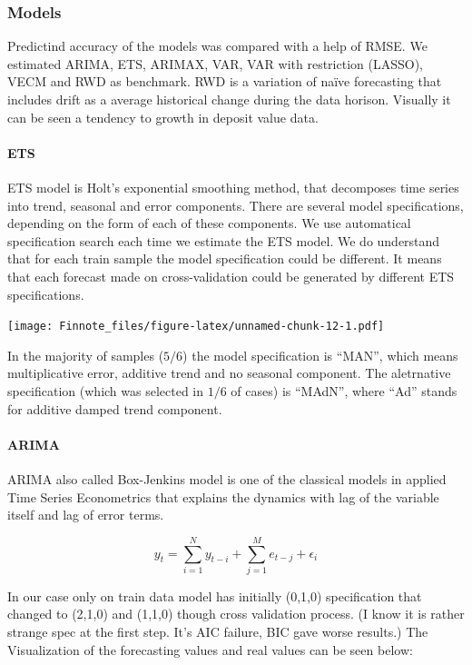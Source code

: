 \documentclass[
]{article}
\begin{document}
\hypertarget{models}{%
\subsubsection{Models}\label{models}}

Predictind accuracy of the models was compared with a help of RMSE. We
estimated ARIMA, ETS, ARIMAX, VAR, VAR with restriction (LASSO), VECM
and RWD as benchmark. RWD is a variation of naïve forecasting that
includes drift as a average historical change during the data horison.
Visually it can be seen a tendency to growth in deposit value data.

\hypertarget{ets}{%
\paragraph{ETS}\label{ets}}

ETS model is Holt's exponential smoothing method, that decomposes time
series into trend, seasonal and error components. There are several
model specifications, depending on the form of each of these components.
We use automatical specification search each time we estimate the ETS
model. We do understand that for each train sample the model
specification could be different. It means that each forecast made on
cross-validation could be generated by different ETS specifications.

\texttt{[image: Finnote\_files/figure-latex/unnamed-chunk-12-1.pdf]}

In the majority of samples (\(5/6\)) the model specification is ``MAN'',
which means multiplicative error, additive trend and no seasonal
component. The aletrnative specification (which was selected in \(1/6\)
of cases) is ``MAdN'', where ``Ad'' stands for additive damped trend
component.

\hypertarget{arima}{%
\paragraph{ARIMA}\label{arima}}

ARIMA also called Box-Jenkins model is one of the classical models in
applied Time Series Econometrics that explains the dynamics with lag of
the variable itself and lag of error terms.

\[
y_t=\sum_{i=1}^N y_{t-i}+\sum_{j=1}^M e_{t-j}+\epsilon_i
\]

In our case only on train data model has initially (0,1,0) specification
that changed to (2,1,0) and (1,1,0) though cross validation process. (I
know it is rather strange spec at the first step. It's AIC failure, BIC
gave worse results.) The Visualization of the forecasting values and
real values can be seen below:
\end{document}
